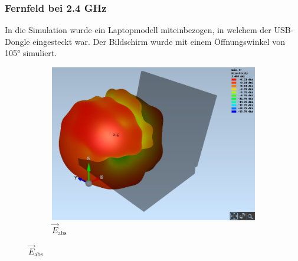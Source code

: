 \subsubsection{Fernfeld bei 2.4 GHz}
In die Simulation wurde ein Laptopmodell miteinbezogen, in welchem der USB-Dongle eingesteckt war. Der Bildschirm wurde mit einem Öffnungswinkel von 105° simuliert.

\begin{figure}[h!]
	\centering
	\begin{subfigure}[b]{0.96\textwidth}
		\includegraphics[width=1\textwidth]{../fig/plt/crazy_stuff_l4_pcb_v2c_laptop_1a_105_2ghz4_3d_farfield_eabs_xyz.png}
		\caption{$\vec{E}_{\mathrm{abs}}$}
	\end{subfigure}
	

\end{figure}
